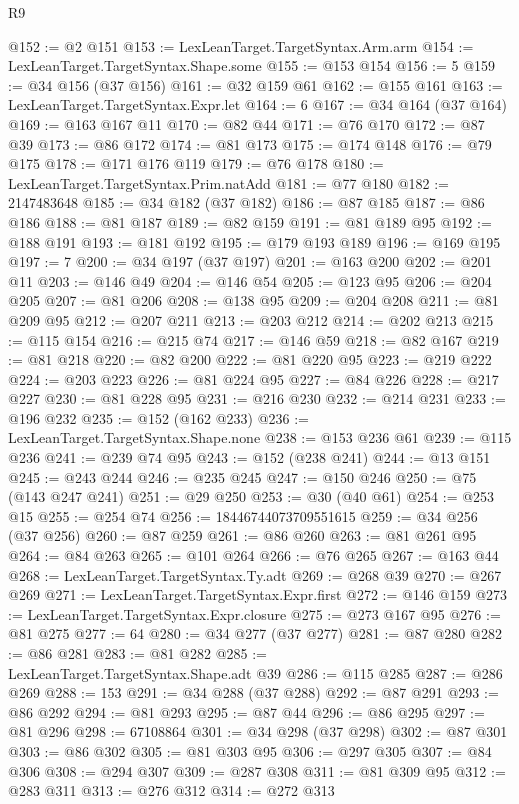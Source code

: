 \begin{lexlean}{R9}
\begin{coremodule}
@152 := @2 @151
@153 := LexLeanTarget.TargetSyntax.Arm.arm
@154 := LexLeanTarget.TargetSyntax.Shape.some
@155 := @153 @154
@156 := 5
@159 := @34 @156 (@37 @156)
@161 := @32 @159 @61
@162 := @155 @161
@163 := LexLeanTarget.TargetSyntax.Expr.let
@164 := 6
@167 := @34 @164 (@37 @164)
@169 := @163 @167 @11
@170 := @82 @44
@171 := @76 @170
@172 := @87 @39
@173 := @86 @172
@174 := @81 @173
@175 := @174 @148
@176 := @79 @175
@178 := @171 @176 @119
@179 := @76 @178
@180 := LexLeanTarget.TargetSyntax.Prim.natAdd
@181 := @77 @180
@182 := 2147483648
@185 := @34 @182 (@37 @182)
@186 := @87 @185
@187 := @86 @186
@188 := @81 @187
@189 := @82 @159
@191 := @81 @189 @95
@192 := @188 @191
@193 := @181 @192
@195 := @179 @193 @189
@196 := @169 @195
@197 := 7
@200 := @34 @197 (@37 @197)
@201 := @163 @200
@202 := @201 @11
@203 := @146 @49
@204 := @146 @54
@205 := @123 @95
@206 := @204 @205
@207 := @81 @206
@208 := @138 @95
@209 := @204 @208
@211 := @81 @209 @95
@212 := @207 @211
@213 := @203 @212
@214 := @202 @213
@215 := @115 @154
@216 := @215 @74
@217 := @146 @59
@218 := @82 @167
@219 := @81 @218
@220 := @82 @200
@222 := @81 @220 @95
@223 := @219 @222
@224 := @203 @223
@226 := @81 @224 @95
@227 := @84 @226
@228 := @217 @227
@230 := @81 @228 @95
@231 := @216 @230
@232 := @214 @231
@233 := @196 @232
@235 := @152 (@162 @233)
@236 := LexLeanTarget.TargetSyntax.Shape.none
@238 := @153 @236 @61
@239 := @115 @236
@241 := @239 @74 @95
@243 := @152 (@238 @241)
@244 := @13 @151
@245 := @243 @244
@246 := @235 @245
@247 := @150 @246
@250 := @75 (@143 @247 @241)
@251 := @29 @250
@253 := @30 (@40 @61)
@254 := @253 @15
@255 := @254 @74
@256 := 18446744073709551615
@259 := @34 @256 (@37 @256)
@260 := @87 @259
@261 := @86 @260
@263 := @81 @261 @95
@264 := @84 @263
@265 := @101 @264
@266 := @76 @265
@267 := @163 @44
@268 := LexLeanTarget.TargetSyntax.Ty.adt
@269 := @268 @39
@270 := @267 @269
@271 := LexLeanTarget.TargetSyntax.Expr.first
@272 := @146 @159
@273 := LexLeanTarget.TargetSyntax.Expr.closure
@275 := @273 @167 @95
@276 := @81 @275
@277 := 64
@280 := @34 @277 (@37 @277)
@281 := @87 @280
@282 := @86 @281
@283 := @81 @282
@285 := LexLeanTarget.TargetSyntax.Shape.adt @39
@286 := @115 @285
@287 := @286 @269
@288 := 153
@291 := @34 @288 (@37 @288)
@292 := @87 @291
@293 := @86 @292
@294 := @81 @293
@295 := @87 @44
@296 := @86 @295
@297 := @81 @296
@298 := 67108864
@301 := @34 @298 (@37 @298)
@302 := @87 @301
@303 := @86 @302
@305 := @81 @303 @95
@306 := @297 @305
@307 := @84 @306
@308 := @294 @307
@309 := @287 @308
@311 := @81 @309 @95
@312 := @283 @311
@313 := @276 @312
@314 := @272 @313

\end{coremodule}
\end{lexlean}
